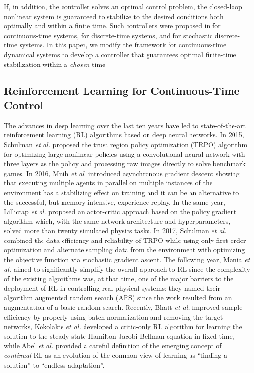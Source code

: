 \documentclass[lettersize,journal]{IEEEtran}
\begin{document}
If, in addition, the controller solves an optimal control problem, the closed-loop nonlinear system is guaranteed to stabilize to the desired conditions both optimally and within a finite time. Such controllers were proposed in \cite{haddad2015finite} for continuous-time systems, \cite{haddad2023finite} for discrete-time systems, and \cite{lee2023finite} for stochastic discrete-time systems. In this paper, we modify the framework for continuous-time dynamical systems \cite{haddad2015finite} to develop a controller that guarantees optimal finite-time stabilization within a \emph{chosen} time.








\subsection{Reinforcement Learning for Continuous-Time Control}          
The advances in deep learning over the last ten years have led to state-of-the-art reinforcement learning (RL) algorithms based on deep neural networks. In 2015, Schulman \emph{et al.} \cite{pmlr-v37-schulman15} proposed the trust region policy optimization (TRPO)  algorithm for optimizing large nonlinear policies using a convolutional neural network with three layers as the policy and processing raw images directly to solve benchmark games. In 2016, Mnih \emph{et al.} \cite{mnih2016asynchronous} introduced asynchronous gradient descent showing that executing multiple agents in parallel on multiple instances of the environment has a stabilizing effect on training and it can be an alternative to the successful, but memory intensive, experience replay. In the same year, Lillicrap \emph{et al.} \cite{lillicrap2019continuouscontroldeepreinforcement} proposed an actor-critic approach based on the policy gradient algorithm which, with the same network architecture and hyperparameters, solved more than twenty simulated physics tasks. In 2017, Schulman \emph{et al.} \cite{schulman2017proximal} combined the data efficiency and reliability of TRPO while using only first-order optimization and alternate sampling data from the environment with optimizing the objective function via stochastic gradient ascent. The following year, Mania \emph{et al.} \cite{NEURIPS2018_7634ea65} aimed to significantly simplify the overall approach to RL since the complexity of the existing algorithms was, at that time, one of the major barriers to the deployment of RL in controlling real physical systems; they named their algorithm augmented random search (ARS) since the work resulted from an augmentation of a basic random search. Recently, Bhatt \emph{et al.} \cite{bhattcrossq} improved sample efficiency by properly using batch normalization and removing the target networks, Kokolakis \emph{et al.} \cite{kokolakis2023fixed} developed a critic-only RL algorithm for learning the solution to the steady-state Hamilton-Jacobi-Bellman equation in fixed-time, while Abel \emph{et al.} \cite{abel2024definition} provided a careful definition of the emerging concept of \emph{continual} RL as an evolution of the common view of learning as ``finding a solution'' to ``endless adaptation''.   
\end{document}
